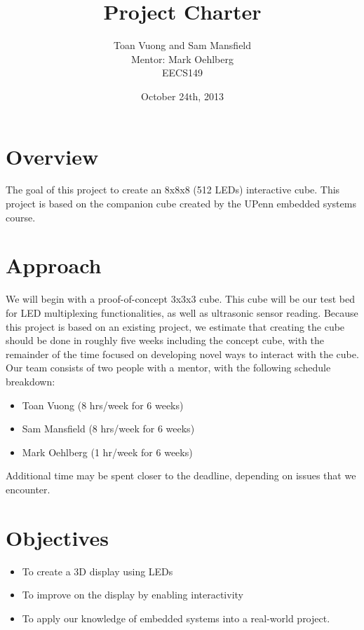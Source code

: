 \documentclass[10pt]{article}
\begin{document}
  \title{Project Charter}
  \author{Toan Vuong and Sam Mansfield\\
          Mentor: Mark Oehlberg\\ 
          EECS149}
  \date{October 24th, 2013}
  \maketitle

  \section{Overview}
    The goal of this project to create an 8x8x8 (512 LEDs) interactive cube. This project is based on the companion cube created by the UPenn embedded systems course.

  \section{Approach}
    We will begin with a proof-of-concept 3x3x3 cube. This cube will be our test bed for LED multiplexing functionalities, as well as ultrasonic sensor reading. Because this project is based on an existing project, we estimate that creating the cube should be done in roughly five weeks including the concept cube, with the remainder of the time focused on developing novel ways to interact with the cube. Our team consists of two people with a mentor, with the following schedule breakdown: \\
    \begin{itemize}[topsep=0ex]
    \item Toan Vuong (8 hrs/week for 6 weeks)
    \item Sam Mansfield (8 hrs/week for 6 weeks)
    \item Mark Oehlberg (1 hr/week for 6 weeks)
    \end{itemize}
    Additional time may be spent closer to the deadline, depending on issues that we encounter.
  \section{Objectives}
    \begin{itemize}[topsep=0ex]
    \itemsep0em
    \item To create a 3D display using LEDs
    \item To improve on the display by enabling interactivity
    \item To apply our knowledge of embedded systems into a real-world project.
    \end{itemize}
\end{document}
